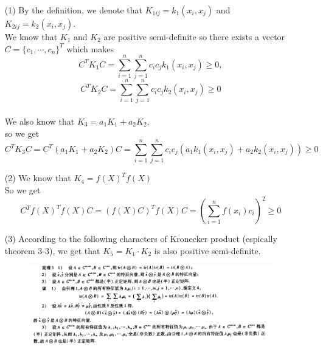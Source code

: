 \begin{solution}
    \begin{enumerate}
        \item[(1)] By the definition, we denote that $K_{1ij}=k_1(x_i,x_j)$ and $K_{2ij}=k_2(x_i,x_j)$.\\
            We know that $K_1$ and $K_2$ are positive semi-definite so there exists a vector $C=\{c_1,\cdots,c_n\}^T$ which makes \[C^T K_1 C=\sum_{i=1}^{n}\sum_{j=1}^{n} c_i c_j k_1(x_i,x_j)\geq 0,\]\[ C^T K_2 C=\sum_{i=1}^{n}\sum_{j=1}^{n} c_i c_j k_2(x_i,x_j)\geq 0\]\\
            We also know that $K_3 = a_1K_1 + a_2K_2$,\\
            so we get \[C^T K_3 C=C^T(a_1 K_1+a_2 K_2)C=\sum_{i=1}^{n}\sum_{j=1}^{n}c_ic_j(a_1k_1(x_i,x_j)+a_2k_2(x_i,x_j))\geq 0\]
        \item[(2)] We know that $K_4=f(X)^Tf(X)$\\
            So we get \[C^Tf(X)^Tf(X)C=(f(X)C)^Tf(X)C=(\sum_{i=1}^{n}f(x_i)c_i)^2\geq 0\]
        \item[(3)] According to the following characters of Kronecker product (espically theorem 3-3), we get that $K_5=K_1\cdot K_2$ is also positive semi-definite.\begin{figure}[H]
                \centering
                \includegraphics[scale=0.5]{1.png}
        \end{figure}
    \end{enumerate}
\end{solution}
